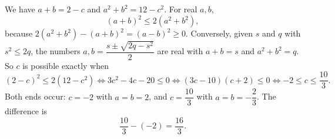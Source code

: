 We have $a+b=2-c$ and $a^2+b^2=12-c^2$. For real $a,b$,
\[
(a+b)^2\le 2(a^2+b^2),
\]
because $2(a^2+b^2)-(a+b)^2=(a-b)^2\ge0$. Conversely, given $s$ and $q$ with $s^2\le 2q$, the numbers $a,b=\dfrac{s\pm\sqrt{2q-s^2}}{2}$ are real with $a+b=s$ and $a^2+b^2=q$. So $c$ is possible exactly when
\[
(2-c)^2\le 2(12-c^2)\iff 3c^2-4c-20\le0\iff (3c-10)(c+2)\le 0\iff -2\le c\le \dfrac{10}{3}.
\]
Both ends occur: $c=-2$ with $a=b=2$, and $c=\dfrac{10}{3}$ with $a=b=-\dfrac{2}{3}$. The difference is
\[
\dfrac{10}{3}-(-2)=\boxed{\dfrac{16}{3}}.
\]
